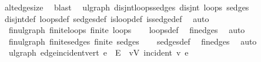 \begin{isabellebody}
\ alt{\isacharunderscore}{\kern0pt}edge{\isacharunderscore}{\kern0pt}size\ \isamarkupfalse%
\ blast%
\endisatagproof
{\isafoldproof}%
%
\isadelimproof
\isanewline
%
\endisadelimproof
\isanewline
{}\isamarkupfalse%
\ {\isacharparenleft}{\kern0pt}\ ulgraph{\isacharparenright}{\kern0pt}\ disjnt{\isacharunderscore}{\kern0pt}loops{\isacharunderscore}{\kern0pt}sedges{\isacharcolon}{\kern0pt}\ {\isachardoublequoteopen}disjnt\ loops\ sedges{\isachardoublequoteclose}\isanewline
%
\isadelimproof
\ \ %
\endisadelimproof
%
\isatagproof
{}\isamarkupfalse%
\ disjnt{\isacharunderscore}{\kern0pt}def\ loops{\isacharunderscore}{\kern0pt}def\ sedges{\isacharunderscore}{\kern0pt}def\ is{\isacharunderscore}{\kern0pt}loop{\isacharunderscore}{\kern0pt}def\ is{\isacharunderscore}{\kern0pt}sedge{\isacharunderscore}{\kern0pt}def\ \isamarkupfalse%
\ auto%
\endisatagproof
{\isafoldproof}%
%
\isadelimproof
\isanewline
%
\endisadelimproof
\isanewline
{}\isamarkupfalse%
\ {\isacharparenleft}{\kern0pt}\ fin{\isacharunderscore}{\kern0pt}ulgraph{\isacharparenright}{\kern0pt}\ finite{\isacharunderscore}{\kern0pt}loops{\isacharcolon}{\kern0pt}\ {\isachardoublequoteopen}finite\ loops{\isachardoublequoteclose}\isanewline
%
\isadelimproof
\ \ %
\endisadelimproof
%
\isatagproof
{}\isamarkupfalse%
\ loops{\isacharunderscore}{\kern0pt}def\ \isamarkupfalse%
\ fin{\isacharunderscore}{\kern0pt}edges\ \isamarkupfalse%
\ auto%
\endisatagproof
{\isafoldproof}%
%
\isadelimproof
\isanewline
%
\endisadelimproof
\isanewline
{}\isamarkupfalse%
\ {\isacharparenleft}{\kern0pt}\ fin{\isacharunderscore}{\kern0pt}ulgraph{\isacharparenright}{\kern0pt}\ finite{\isacharunderscore}{\kern0pt}sedges{\isacharcolon}{\kern0pt}\ {\isachardoublequoteopen}finite\ sedges{\isachardoublequoteclose}\isanewline
%
\isadelimproof
\ \ %
\endisadelimproof
%
\isatagproof
{}\isamarkupfalse%
\ sedges{\isacharunderscore}{\kern0pt}def\ \isamarkupfalse%
\ fin{\isacharunderscore}{\kern0pt}edges\ \isamarkupfalse%
\ auto%
\endisatagproof
{\isafoldproof}%
%
\isadelimproof
\isanewline
%
\endisadelimproof
\isanewline
{}\isamarkupfalse%
\ {\isacharparenleft}{\kern0pt}\ ulgraph{\isacharparenright}{\kern0pt}\ edge{\isacharunderscore}{\kern0pt}incident{\isacharunderscore}{\kern0pt}vert{\isacharcolon}{\kern0pt}\ {\isachardoublequoteopen}e\ {\isasymin}\ E\ {\isasymLongrightarrow}\ {\isasymexists}v{\isasymin}V{\isachardot}{\kern0pt}\ incident\ v\ e{\isachardoublequoteclose}\isanewline

\end{isabellebody}
